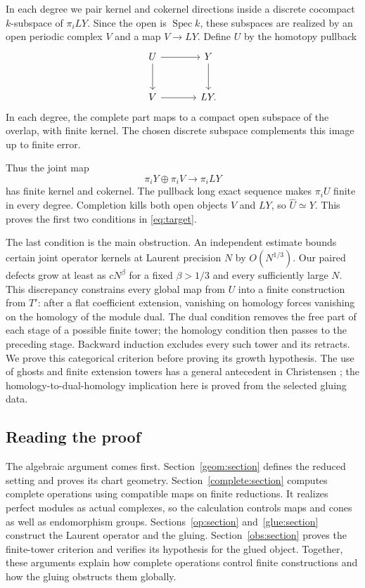 \documentclass[11pt]{article}
\DeclareMathOperator{\Spec}{Spec}
\theoremstyle{definition}
\theoremstyle{remark}
\numberwithin{equation}{section}
\begin{document}
In each degree we pair kernel and cokernel directions inside a
discrete cocompact $k$-subspace of $\pi_iLY$. Since the open is
$\Spec k$, these subspaces are realized by an open periodic complex
$V$ and a map $V\to LY$. Define $U$ by the homotopy pullback
\[
\begin{tikzcd}[column sep=large,row sep=large]
 U \arrow[r] \arrow[d] & Y \arrow[d] \\
 V \arrow[r] & LY .
\end{tikzcd}
\]
In each degree, the complete part maps to a compact open subspace of
the overlap, with finite kernel. The chosen discrete subspace
complements this image up to finite error.

Thus the joint map
\[
 \pi_iY\oplus\pi_iV\longrightarrow\pi_iLY
\]
has finite kernel and cokernel. The pullback long exact sequence makes
$\pi_iU$ finite in every degree.
Completion kills both open objects $V$ and $LY$, so
$\widehat U\simeq Y$. This proves the first two conditions in
\eqref{eq:target}.

The last condition is the main obstruction. An independent estimate
bounds certain joint operator kernels at Laurent precision $N$ by
$O(N^{1/3})$. Our paired defects grow at least as $cN^\beta$ for a
fixed $\beta>1/3$ and every sufficiently large $N$.
This discrepancy constrains every global map from $U$ into a finite
construction from $T'$: after a flat coefficient extension, vanishing
on homology forces vanishing on the homology of the module dual.
The dual condition removes the free part of each stage of a possible
finite tower; the homology condition then passes to the preceding
stage. Backward induction excludes every such tower and its retracts.
We prove this categorical criterion before proving its growth
hypothesis. The use of ghosts and finite extension towers has a
general antecedent in Christensen \cite{Christensen1998}; the
homology-to-dual-homology implication here is proved from the selected
gluing data.

\subsection{Reading the proof}

The algebraic argument comes first. Section~\ref{geom:section} defines
the reduced setting and proves its chart geometry. Section~\ref{complete:section}
computes complete operations using compatible maps on finite reductions.
It realizes perfect modules as actual complexes, so the calculation controls
maps and cones as well as endomorphism groups. Sections~\ref{op:section}
and~\ref{glue:section} construct the Laurent operator and the gluing.
Section~\ref{obs:section} proves the finite-tower criterion and verifies
its hypothesis for the glued object. Together, these arguments explain how
complete operations control finite constructions and how the gluing
obstructs them globally.
\end{document}

